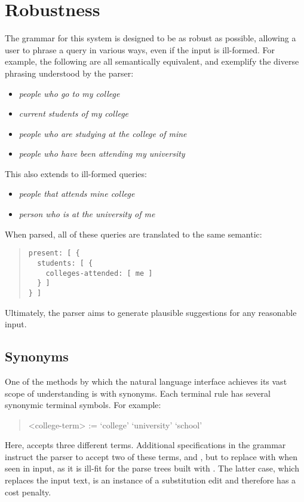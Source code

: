 \documentclass{article}
\begin{document}
\section{Robustness}
The grammar for this system is designed to be as robust as possible, allowing a user to phrase a query in various ways, even if the input is ill-formed. For example, the following are all semantically equivalent, and exemplify the diverse phrasing understood by the parser:
\begin{itemize}
\item \textit{people who go to my college}
\item \textit{current students of my college}
\item \textit{people who are studying at the college of mine}
\item \textit{people who have been attending my university}
\end{itemize}
This also extends to ill-formed queries:
\begin{itemize}
\item \textit{people that attends mine college}
\item \textit{person who is at the university of me}
\end{itemize}
When parsed, all of these queries are translated to the same semantic:
\begin{quote}
\begin{verbatim}
present: [ {
  students: [ {
    colleges-attended: [ me ]
  } ]
} ]
\end{verbatim}
\end{quote}
Ultimately, the parser aims to generate plausible suggestions for any reasonable input.

\subsection{Synonyms}
One of the methods by which the natural language interface achieves its vast scope of understanding is with synonyms. Each terminal rule has several synonymic terminal symbols. For example:
\begin{quote}
\setlength{\grammarindent}{8em}
\begin{grammar}
<college-term> := `college'
\alt `university'
\alt `school'
\end{grammar}
\end{quote}
Here,  accepts three different terms. Additional specifications in the grammar instruct the parser to accept two of these terms,  and , but to replace  with  when seen in input, as it is ill-fit for the parse trees built with . The latter case, which replaces the input text, is an instance of a substitution edit and therefore has a cost penalty.
\end{document}
